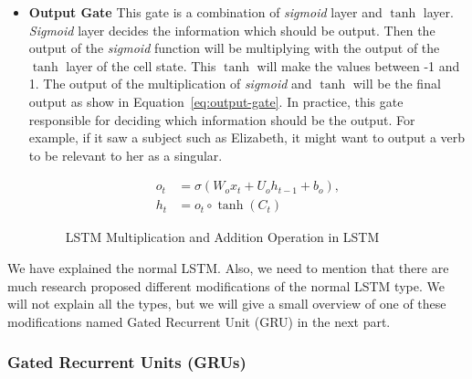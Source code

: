 \begin{itemize}
      
    \item \textbf{Output Gate} This gate is a combination of \textit{sigmoid} layer and \textit{$\tanh$} layer. \textit{Sigmoid} layer decides the information which should be output. Then the output of the  \textit{sigmoid} function will be multiplying with the output of the \textit{$\tanh$} layer of the cell state. This \textit{$\tanh$} will make the values between -1 and 1. The output of the multiplication of \textit{sigmoid} and \textit{$\tanh$} will be the final output as show in Equation~\eqref{eq:output-gate}. In practice, this gate responsible for deciding which information should be the output. For example, if it saw a subject such as Elizabeth, it might want to output a verb to be relevant to her as a singular.



\begin{subequations}\label{eq:output-gate}
\begin{align}
o_t  &= \sigma(W_o  x_t + U_o h_{t-1} + b_o),\\
h_t  &= o_t \circ \tanh(C_t)
\end{align}
\end{subequations}

      
\begin{figure}[ht!]
  \centering
  
        \caption{LSTM Multiplication and Addition Operation in LSTM~\cite{colah}}\label{fig:LSTM-output-gate}
      \end{figure}
      
    \end{itemize}

    
    We have explained the normal LSTM. Also, we need to mention that there are much research proposed different modifications of the normal LSTM type. We will not explain all the types, but we will give a small overview of one of these modifications named Gated Recurrent Unit (GRU) in the next part.

\subsubsection{Gated Recurrent Units (GRUs)}

